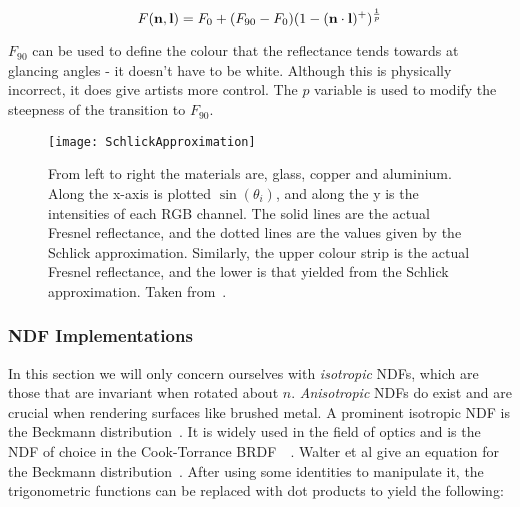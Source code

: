 \begin{equation}
	F(\mathbf{n}, \mathbf{l}) = F_0 + (F_{90} - F_0)(1 - (\mathbf{n}\cdot\mathbf{l})^+)^\frac{1}{p}
\end{equation}

\begin{math}F_{90}\end{math} can be used to define the colour that the reflectance tends towards at glancing angles - it doesn't have to be white. Although this is physically incorrect, it does give artists more control. The \begin{math}p\end{math} variable is used to modify the steepness of the transition to \begin{math}F_{90}\end{math}.

\begin{figure}[h]
	\centering
	\texttt{[image: SchlickApproximation]}
	\caption{From left to right the materials are, glass, copper and aluminium. Along the x-axis is plotted \begin{math}\sin(\theta_i)\end{math}, and along the y is the intensities of each RGB channel. The solid lines are the actual Fresnel reflectance, and the dotted lines are the values given by the Schlick approximation. Similarly, the upper colour strip is the actual Fresnel reflectance, and the lower is that yielded from the Schlick approximation. Taken from~\cite{RTR4}.}
	\label{fig:SchlickApproximation}
\end{figure}

\subsubsection{NDF Implementations}

In this section we will only concern ourselves with \textit{isotropic} NDFs, which are those that are invariant when rotated about \begin{math}n\end{math}. \textit{Anisotropic} NDFs do exist and are crucial when rendering surfaces like brushed metal. A prominent isotropic NDF is the Beckmann distribution~\cite{Beckmann}. It is widely used in the field of optics and is the NDF of choice in the Cook-Torrance BRDF~\cite{WalterRefraction}~\cite{CookTorrance}. Walter et al give an equation for the Beckmann distribution~\cite{WalterRefraction}. After using some identities to manipulate it, the trigonometric functions can be replaced with dot products to yield the following:


